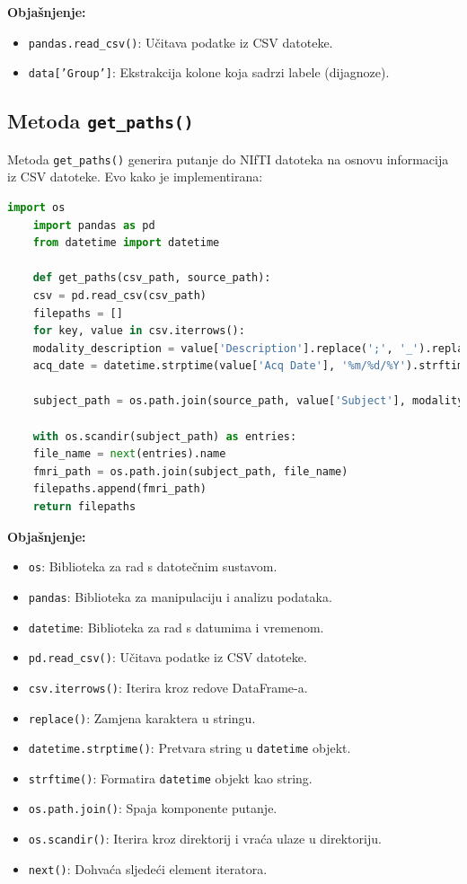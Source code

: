 \documentclass[zavrsnirad]{fer}
\begin{document}
\noindent \textbf{Objašnjenje:}
\begin{itemize}
	\item \texttt{pandas.read\_csv()}: Učitava podatke iz CSV datoteke.
	\item \texttt{data['Group']}: Ekstrakcija kolone koja sadrzi labele (dijagnoze).
\end{itemize}

\subsection{Metoda \texttt{get\_paths()}}

Metoda \texttt{get\_paths()} generira putanje do NIfTI datoteka na osnovu informacija iz CSV datoteke. Evo kako je implementirana:

\begin{lstlisting}[language=Python, caption={Metoda get\_paths()}]
	import os
	import pandas as pd
	from datetime import datetime
	
	def get_paths(csv_path, source_path):
	csv = pd.read_csv(csv_path)
	filepaths = []
	for key, value in csv.iterrows():
	modality_description = value['Description'].replace(';', '_').replace(' ', '_')
	acq_date = datetime.strptime(value['Acq Date'], '%m/%d/%Y').strftime('%Y-%m-%d')
	
	subject_path = os.path.join(source_path, value['Subject'], modality_description, acq_date, value['Image Data ID'])
	
	with os.scandir(subject_path) as entries:
	file_name = next(entries).name
	fmri_path = os.path.join(subject_path, file_name)
	filepaths.append(fmri_path)
	return filepaths
\end{lstlisting}

\noindent \textbf{Objašnjenje:}
\begin{itemize}
	\item \texttt{os}: Biblioteka za rad s datotečnim sustavom.
	\item \texttt{pandas}: Biblioteka za manipulaciju i analizu podataka.
	\item \texttt{datetime}: Biblioteka za rad s datumima i vremenom.
	\item \texttt{pd.read\_csv()}: Učitava podatke iz CSV datoteke.
	\item \texttt{csv.iterrows()}: Iterira kroz redove DataFrame-a.
	\item \texttt{replace()}: Zamjena karaktera u stringu.
	\item \texttt{datetime.strptime()}: Pretvara string u \texttt{datetime} objekt.
	\item \texttt{strftime()}: Formatira \texttt{datetime} objekt kao string.
	\item \texttt{os.path.join()}: Spaja komponente putanje.
	\item \texttt{os.scandir()}: Iterira kroz direktorij i vraća ulaze u direktoriju.
	\item \texttt{next()}: Dohvaća sljedeći element iteratora.
\end{itemize}
\end{document}

